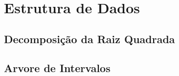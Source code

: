 \section{Estrutura de Dados}
\subsection{Decomposição da Raiz Quadrada}


\subsection{Arvore de Intervalos}
\newpage